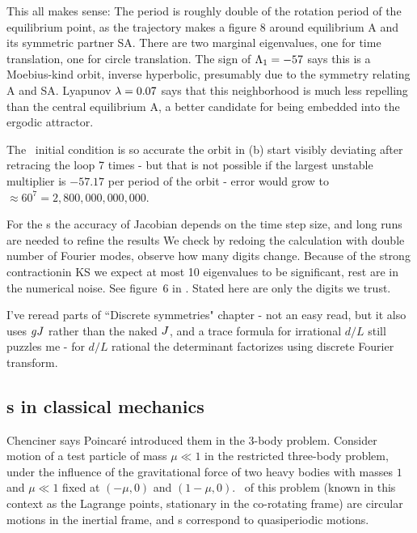 This all makes sense: The period is roughly double of the rotation period of
the equilibrium point, as the trajectory makes a figure 8 around equilibrium A and
its symmetric partner SA.
 There are two
marginal eigenvalues, one for time translation, one for
circle translation. 
The sign of $\Lambda_{1}=-57$ says this is a Moebius-kind orbit,
inverse hyperbolic, presumably due to the symmetry relating A and SA.
Lyapunov $\lambda=0.07$ says that this neighborhood is much less repelling than
the central equilibrium A, a better candidate for being embedded into the
ergodic attractor.

The \rpo\ initial condition is
so accurate the orbit in (b)
start visibly deviating after retracing the loop 7 times - but that
is not possible if the largest unstable multiplier is 
$-57.17$ per period of the orbit - error would grow to $\approx 60^7
= 2,800,000,000,000$.

For the \rpo s the accuracy of Jacobian depends
on the time step size, and long runs are needed to refine the results
We check by redoing the calculation with double 
number of Fourier modes, observe how many digits
change. 
Because of the strong contractionin KS we expect at most 10 eigenvalues to be
significant, rest are in the numerical noise. See figure~6 in
.
Stated here are only the digits we trust.


I've reread parts of ``Discrete symmetries" chapter - not an easy read, but
it also uses $g{J}$ rather than the naked ${J}$, and a trace formula for irrational
$d/L$ still puzzles me - for $d/L$ rational the determinant factorizes using
discrete Fourier transform.

\subsection{{\Rpo s} in classical mechanics}

Chenciner
says Poincar\'e introduced them in the 3-body problem.
Consider motion of a test particle of mass
$\mu \ll 1$ in the
restricted three-body problem,
under the
influence of the gravitational force of two heavy bodies with masses $1$ and
$\mu \ll 1$ fixed at $(-\mu,0)$ and $(1-\mu,0)$. \Reqv\ of this problem
(known in this context as the Lagrange points, stationary in
the co-rotating frame) are circular motions in the inertial frame,
and {\rpo s} correspond to quasiperiodic motions. 

